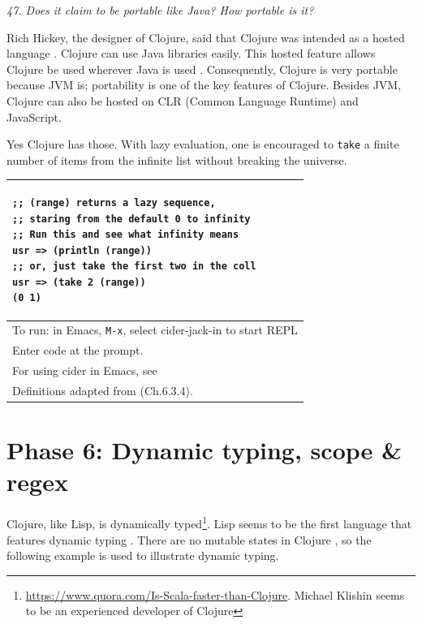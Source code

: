 \documentclass[12pt]{article}
\begin{document}

{\it 47. Does it claim to be portable like Java? How portable is it?}

Rich Hickey, the designer of Clojure, said that Clojure was intended as a hosted language .  Clojure can use Java libraries easily. This hosted feature allows Clojure be used wherever Java is used \cite{hickey}. Consequently, Clojure is very portable because JVM is; portability is one of the key features of Clojure. Besides JVM, Clojure can also be hosted on CLR (Common Language Runtime) and JavaScript.




Yes Clojure has those. With lazy evaluation, one is encouraged to \texttt{take} a finite number of items from the infinite list without breaking the universe.

\begin{tabular}{|p{}|}
\hline
\begin{verbatim}
;; (range) returns a lazy sequence,
;; staring from the default 0 to infinity
;; Run this and see what infinity means
usr => (println (range))
;; or, just take the first two in the coll
usr => (take 2 (range))
(0 1)
\end{verbatim}
\\
\hline
To run: in Emacs, \texttt{M-x}, select cider-jack-in to start REPL\\
Enter code at the prompt.\\
For using cider in Emacs, see \cite{brave2015}\\
\hline
Definitions adapted from \cite{empty} \cite{fogus2014joy} (Ch.6.3.4).\\
\hline
\end{tabular}



\section{Phase 6: Dynamic typing, scope \& regex}



Clojure, like Lisp, is dynamically typed\footnote{\url{https://www.quora.com/Is-Scala-faster-than-Clojure}. Michael Klishin seems to be an experienced developer of Clojure}. Lisp seems to be the first language that features dynamic typing \cite{tratt}.  There are no mutable states in Clojure \cite{fogus2014joy}, so the following example is used to illustrate dynamic typing.
\end{document}
